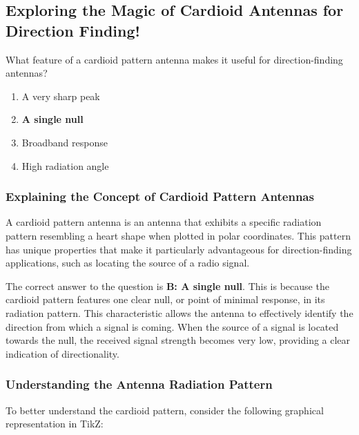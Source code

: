 \subsection{Exploring the Magic of Cardioid Antennas for Direction Finding!}

\begin{tcolorbox}[colback=gray!10, colframe=black, title=E9H11] What feature of a cardioid pattern antenna makes it useful for direction-finding antennas? 
\begin{enumerate}
    \item A very sharp peak
    \item \textbf{A single null}
    \item Broadband response
    \item High radiation angle
\end{enumerate} \end{tcolorbox}

\subsubsection{Explaining the Concept of Cardioid Pattern Antennas}

A cardioid pattern antenna is an antenna that exhibits a specific radiation pattern resembling a heart shape when plotted in polar coordinates. This pattern has unique properties that make it particularly advantageous for direction-finding applications, such as locating the source of a radio signal.

The correct answer to the question is 
\textbf{B: A single null}. This is because the cardioid pattern features one clear null, or point of minimal response, in its radiation pattern. This characteristic allows the antenna to effectively identify the direction from which a signal is coming. When the source of a signal is located towards the null, the received signal strength becomes very low, providing a clear indication of directionality.

\subsubsection{Understanding the Antenna Radiation Pattern}

To better understand the cardioid pattern, consider the following graphical representation in TikZ:

\begin{center}
\end{center}

